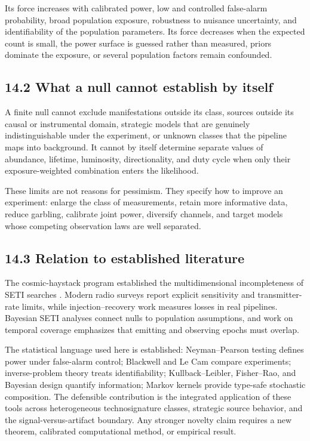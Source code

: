 \documentclass[11pt,a4paper]{article}
\begin{document}
Its force increases with calibrated power, low and controlled false-alarm probability, broad population exposure, robustness to nuisance uncertainty, and identifiability of the population parameters. Its force decreases when the expected count is small, the power surface is guessed rather than measured, priors dominate the exposure, or several population factors remain confounded.

\subsection{14.2 What a null cannot establish by itself}\label{142-what-a-null-cannot-establish-by-itself}

A finite null cannot exclude manifestations outside its class, sources outside its causal or instrumental domain, strategic models that are genuinely indistinguishable under the experiment, or unknown classes that the pipeline maps into background. It cannot by itself determine separate values of abundance, lifetime, luminosity, directionality, and duty cycle when only their exposure-weighted combination enters the likelihood.

These limits are not reasons for pessimism. They specify how to improve an experiment: enlarge the class of measurements, retain more informative data, reduce garbling, calibrate joint power, diversify channels, and target models whose competing observation laws are well separated.

\subsection{14.3 Relation to established literature}\label{143-relation-to-established-literature}

The cosmic-haystack program established the multidimensional incompleteness of SETI searches \citep{tarter2001,wright2018,sheikh2020}. Modern radio surveys report explicit sensitivity and transmitter-rate limits, while injection--recovery work measures losses in real pipelines. Bayesian SETI analyses connect nulls to population assumptions, and work on temporal coverage emphasizes that emitting and observing epochs must overlap.

The statistical language used here is established: Neyman--Pearson testing defines power under false-alarm control; Blackwell and Le Cam compare experiments; inverse-problem theory treats identifiability; Kullback--Leibler, Fisher--Rao, and Bayesian design quantify information; Markov kernels provide type-safe stochastic composition. The defensible contribution is the integrated application of these tools across heterogeneous technosignature classes, strategic source behavior, and the signal-versus-artifact boundary. Any stronger novelty claim requires a new theorem, calibrated computational method, or empirical result.
\end{document}
